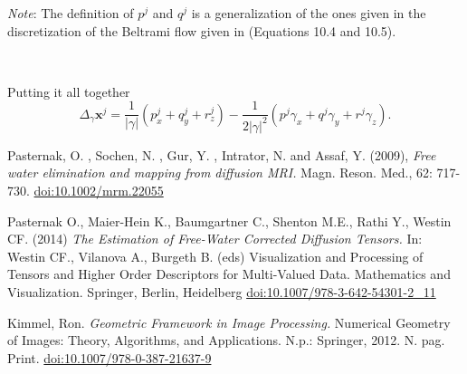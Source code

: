\documentclass[12pt]{article}
\newcommand{\vect}[1]{\mathbf{#1}}
\newcommand{\detgam}{|\gamma|}
\newcommand{\vx}{\vect{x}}
\begin{document}
\noindent \textit{Note}: The definition of $p^j$ and $q^j$ is a generalization
of the ones given in the discretization of the Beltrami flow given in
\cite{Kimmel} (Equations 10.4 and 10.5).

\ 

\noindent
Putting it all together
$$\Delta_\gamma \vx^j = \frac{1}{\detgam}(p^j_x + q^j_y + r^j_z) - 
\frac{1}{2\detgam^2}(p^j \gamma_x + q^j \gamma_y + r^j \gamma_z).$$






\begin{thebibliography}{9}
         Pasternak, O. , Sochen, N. ,
                Gur, Y. , Intrator, N. and Assaf, Y. (2009), \textit{Free water
                elimination and mapping from diffusion MRI.} Magn. Reson.
                Med., 62: 717-730.
                \href{https://doi.org/10.1002/mrm.22055}{doi:10.1002/mrm.22055}

         Pasternak O., Maier-Hein K.,
                Baumgartner C., Shenton M.E., Rathi Y., Westin CF.  (2014)
                \textit{The Estimation of Free-Water Corrected Diffusion
                Tensors.} In: Westin CF., Vilanova A., Burgeth B. (eds)
                Visualization and Processing of Tensors and Higher Order
                Descriptors for Multi-Valued Data. Mathematics and
                Visualization.  Springer, Berlin, Heidelberg
                \href{https://doi.org/10.1007/978-3-642-54301-2\_11}{doi:10.1007/978-3-642-54301-2\_11}

         Kimmel, Ron. \textit{Geometric Framework in
                Image Processing.} Numerical Geometry of Images: Theory,
                Algorithms, and Applications. N.p.: Springer, 2012. N. pag.
                Print.
                \href{https://doi.org/10.1007/978-0-387-21637-9}{doi:10.1007/978-0-387-21637-9}

\end{thebibliography}
\end{document}
